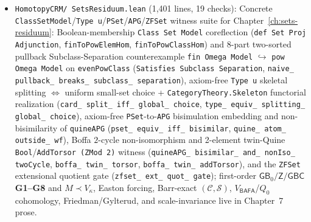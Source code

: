 \begin{itemize}
  \item \texttt{HomotopyCRM/ SetsResiduum.lean} (1,401 lines, 19 checks): Concrete \texttt{ClassSetModel}/\texttt{Type u}/\texttt{PSet}/\texttt{APG}/\texttt{ZFSet} witness suite for Chapter~\ref{ch:sets-residuum}: Boolean-membership \texttt{Class Set Model} coreflection (\texttt{def Set Proj Adjunction}, \texttt{finToPowElemHom}, \texttt{finToPowClassHom}) and 8-part two-sorted pullback Subclass-Separation counterexample \texttt{fin Omega Model} $\hookrightarrow$ \texttt{pow Omega Model} on \texttt{evenPowClass} (\texttt{Satisfies Subclass Separation}, \texttt{naive\_ pullback\_ breaks\_ subclass\_ separation}), axiom-free \texttt{Type u} skeletal splitting $\iff$ uniform small-set choice + \texttt{CategoryTheory.Skeleton} functorial realization (\texttt{card\_ split\_ iff\_ global\_ choice}, \texttt{type\_ equiv\_ splitting\_ global\_ choice}), axiom-free \texttt{PSet}-to-\texttt{APG} bisimulation embedding and non-bisimilarity of \texttt{quineAPG} (\texttt{pset\_ equiv\_ iff\_ bisimilar}, \texttt{quine\_ atom\_ outside\_ wf}), Boffa $2$-cycle non-isomorphism and 2-element twin-Quine \texttt{Bool}/\texttt{AddTorsor (ZMod 2)} witness (\texttt{quineAPG\_ bisimilar\_ and\_ nonIso\_ twoCycle}, \texttt{boffa\_ twin\_ torsor}, \texttt{boffa\_ twin\_ addTorsor}), and the \texttt{ZFSet} extensional quotient gate (\texttt{zfset\_ ext\_ quot\_ gate}); first-order $\mathsf{GB}_0/\mathsf{Z}/\mathsf{GBC}$ \textbf{G1--G8} and $M \prec V_\kappa$, Easton forcing, Barr-exact $(\mathcal{C}, \mathcal{S})$, $V_{\mathsf{BAFA}}$/$Q_0$ cohomology, Friedman/Gylterud, and scale-invariance live in Chapter~7 prose.

\end{itemize}
